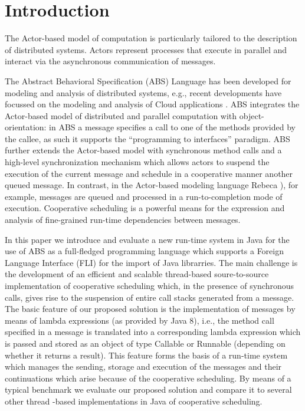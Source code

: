 \section{Introduction}

The Actor-based model of computation \cite{Agha} is particularly tailored to the description of distributed systems.  Actors represent processes that execute in parallel and interact via the asynchronous communication of messages.


The  Abstract Behavioral Specification (ABS) \cite{abs}  Language has been developed
for modeling and analysis of distributed systems, e.g., recent developments
have focussed on the modeling and analysis of Cloud applications \cite{Albert}.
 ABS integrates the Actor-based model of distributed and parallel computation with object-orientation:
in ABS a message specifies a  call to one of the methods provided by the callee,
as such it supports the ``programming to interfaces'' paradigm.
ABS further  extends the Actor-based model with  synchronous method calls and a high-level synchronization mechanism which allows actors to suspend the
execution of the current message and schedule in a cooperative manner another
queued message. 
In contrast, in the Actor-based modeling language Rebeca \cite{Sirjani}), for example,
messages are queued and processed in a run-to-completion mode of execution.
Cooperative scheduling   is a powerful means for the expression and analysis
of fine-grained run-time dependencies between messages.



In this paper we introduce  and evaluate a new run-time system in Java for  the use of ABS as a full-fledged programming language which supports a Foreign Language Interface (FLI) for the import of Java librarries. 
The main challenge is the development of an efficient and scalable  thread-based soure-to-source implementation of cooperative scheduling which, in the presence of synchronous calls,   gives rise to the suspension of  entire call stacks generated
from a message.
The basic feature of our proposed solution is the implementation of messages by means of lambda expressions (as provided by Java 8), i.e., the method call specified in a message
is translated into a corresponding lambda expression which is passed and stored as
an object of type Callable or Runnable (depending on whether it returns  a result).
This  feature forms  the basis of a run-time system which manages
the sending, storage and execution of  the messages and their continuations
which arise because of the cooperative scheduling.
By means of a typical benchmark we evaluate our proposed solution and compare it
to several other thread -based implementations in Java of cooperative scheduling.

